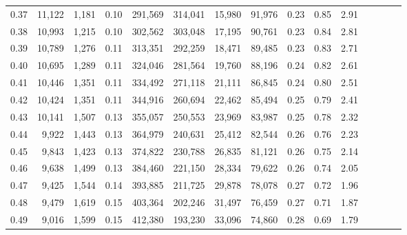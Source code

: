 \begin{tabular}{rrrcrrrrrrrrrrr}
0.37 &  11,122 &  1,181 &                                       0.10 &  291,569 &  314,041 &   15,980 &   91,976 &  0.23 &  0.85 &                         2.91 \\
0.38 &  10,993 &  1,215 &                                       0.10 &  302,562 &  303,048 &   17,195 &   90,761 &  0.23 &  0.84 &                         2.81 \\
0.39 &  10,789 &  1,276 &                                       0.11 &  313,351 &  292,259 &   18,471 &   89,485 &  0.23 &  0.83 &                         2.71 \\
0.40 &  10,695 &  1,289 &                                       0.11 &  324,046 &  281,564 &   19,760 &   88,196 &  0.24 &  0.82 &                         2.61 \\
0.41 &  10,446 &  1,351 &                                       0.11 &  334,492 &  271,118 &   21,111 &   86,845 &  0.24 &  0.80 &                         2.51 \\
0.42 &  10,424 &  1,351 &                                       0.11 &  344,916 &  260,694 &   22,462 &   85,494 &  0.25 &  0.79 &                         2.41 \\
0.43 &  10,141 &  1,507 &                                       0.13 &  355,057 &  250,553 &   23,969 &   83,987 &  0.25 &  0.78 &                         2.32 \\
0.44 &   9,922 &  1,443 &                                       0.13 &  364,979 &  240,631 &   25,412 &   82,544 &  0.26 &  0.76 &                         2.23 \\
0.45 &   9,843 &  1,423 &                                       0.13 &  374,822 &  230,788 &   26,835 &   81,121 &  0.26 &  0.75 &                         2.14 \\
0.46 &   9,638 &  1,499 &                                       0.13 &  384,460 &  221,150 &   28,334 &   79,622 &  0.26 &  0.74 &                         2.05 \\
0.47 &   9,425 &  1,544 &                                       0.14 &  393,885 &  211,725 &   29,878 &   78,078 &  0.27 &  0.72 &                         1.96 \\
0.48 &   9,479 &  1,619 &                                       0.15 &  403,364 &  202,246 &   31,497 &   76,459 &  0.27 &  0.71 &                         1.87 \\
0.49 &   9,016 &  1,599 &                                       0.15 &  412,380 &  193,230 &   33,096 &   74,860 &  0.28 &  0.69 &                         1.79 \\

\end{tabular}
